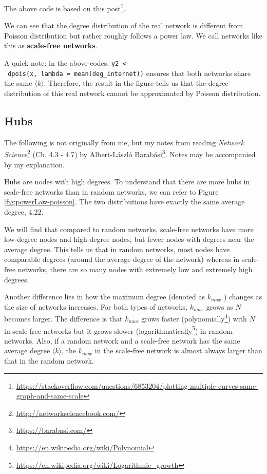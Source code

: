 \documentclass[
]{krantz}
\makeatletter
\renewcommand{\href}[2]{#2\footnote{\url{#1}}}
\newenvironment{kframe}{%
\medskip{}
\setlength{\fboxsep}{.8em}
 \def\at@end@of@kframe{}%
 \ifinner\ifhmode%
  \def\at@end@of@kframe{\end{minipage}}%
  \begin{minipage}{\columnwidth}%
 \fi\fi%
 \def\FrameCommand##1{\hskip\@totalleftmargin \hskip-\fboxsep
 \colorbox{shadecolor}{##1}\hskip-\fboxsep
     \hskip-\linewidth \hskip-\@totalleftmargin \hskip\columnwidth}%
 \MakeFramed {\advance\hsize-\width
   \@totalleftmargin\z@ \linewidth\hsize
   \@setminipage}}%
 {\par\unskip\endMakeFramed%
 \at@end@of@kframe}
\newenvironment{rmdblock}[1]
  {
  \begin{itemize}
  \renewcommand{\labelitemi}{
    \raisebox{-.7\height}[0pt][0pt]{
      {\setkeys{Gin}{width=3em,keepaspectratio}\texttt{[image: images/\#1]}}
    }
  }
  \setlength{\fboxsep}{1em}
  \begin{kframe}
  \item
  }
  {
  \end{kframe}
  \end{itemize}
  }
\newenvironment{rmdnote}
  {\begin{rmdblock}{note}}
  {\end{rmdblock}}
\makeatother
\begin{document}
The above code is based on \href{https://stackoverflow.com/questions/6853204/plotting-multiple-curves-same-graph-and-same-scale}{this post}.

We can see that the degree distribution of the real network is different from Poisson distribution but rather roughly follows a power law. We call networks like this as \textbf{scale-free networks}.

A quick note: in the above codes, \texttt{y2\ \textless{}-\ dpois(x,\ lambda\ =\ mean(deg\_internet))} ensures that both networks share the same \(\langle k \rangle\). Therefore, the result in the figure tells us that the degree distribution of this real network cannot be approximated by Poisson distribution.

\hypertarget{hubs}{%
\subsection{Hubs}\label{hubs}}

\begin{rmdnote}
The following is not originally from me, but my notes from reading \href{http://networksciencebook.com/}{\emph{Network Science}} (Ch. 4.3 - 4.7) by \href{https://barabasi.com/}{Albert-László Barabási}. Notes may be accompanied by my explanation.
\end{rmdnote}

Hubs are nodes with high degrees. To understand that there are more hubs in scale-free networks than in random networks, we can refer to Figure \ref{fig:powerLaw-poisson}. The two distributions have exactly the same average degree, \(4.22\).

We will find that compared to random networks, scale-free networks have more low-degree nodes and high-degree nodes, but fewer nodes with degrees near the average degree. This tells us that in random networks, most nodes have comparable degrees (around the average degree of the network) whereas in scale-free networks, there are so many nodes with extremely low and extremely high degrees.

Another difference lies in how the maximum degree (denoted as \(k_{max}\) ) changes as the size of networks increases. For both types of networks, \(k_{max}\) grows as \(N\) becomes larger. The difference is that \(k_{max}\) grows faster (\href{https://en.wikipedia.org/wiki/Polynomial}{polynomially}) with \(N\) in scale-free networks but it grows slower (\href{https://en.wikipedia.org/wiki/Logarithmic_growth}{logarithmatically}) in random networks. Also, if a random network and a scale-free network has the same average degree \(\langle k \rangle\), the \(k_{max}\) in the scale-free network is almost always larger than that in the random network.
\end{document}
